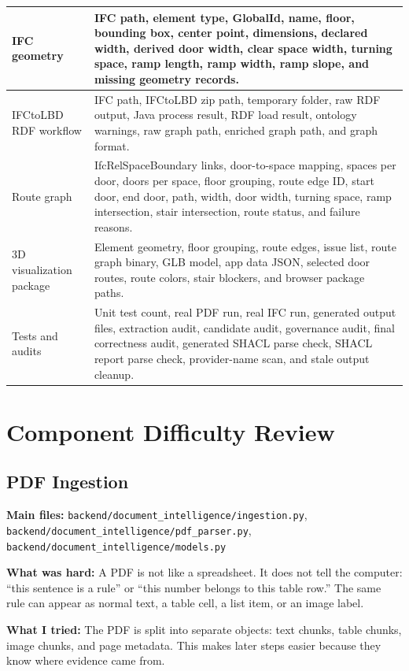 \documentclass[11pt,a4paper]{article}
\begin{document}
\begin{longtable}{|p{3.8cm}|p{11.3cm}|}
\hline
IFC geometry &
IFC path, element type, GlobalId, name, floor, bounding box, center point, dimensions, declared width, derived door width, clear space width, turning space, ramp length, ramp width, ramp slope, and missing geometry records. \\
\hline
IFCtoLBD RDF workflow &
IFC path, IFCtoLBD zip path, temporary folder, raw RDF output, Java process result, RDF load result, ontology warnings, raw graph path, enriched graph path, and graph format. \\
\hline
Route graph &
IfcRelSpaceBoundary links, door-to-space mapping, spaces per door, doors per space, floor grouping, route edge ID, start door, end door, path, width, door width, turning space, ramp intersection, stair intersection, route status, and failure reasons. \\
\hline
3D visualization package &
Element geometry, floor grouping, route edges, issue list, route graph binary, GLB model, app data JSON, selected door routes, route colors, stair blockers, and browser package paths. \\
\hline
Tests and audits &
Unit test count, real PDF run, real IFC run, generated output files, extraction audit, candidate audit, governance audit, final correctness audit, generated SHACL parse check, SHACL report parse check, provider-name scan, and stale output cleanup. \\
\hline
\end{longtable}

\section{Component Difficulty Review}

\subsection{PDF Ingestion}
\textbf{Main files:} \texttt{backend/document\_intelligence/ingestion.py}, \texttt{backend/document\_intelligence/pdf\_parser.py}, \texttt{backend/document\_intelligence/models.py}

\textbf{What was hard:}
A PDF is not like a spreadsheet. It does not tell the computer: ``this sentence is a rule'' or ``this number belongs to this table row.'' The same rule can appear as normal text, a table cell, a list item, or an image label.

\textbf{What I tried:}
The PDF is split into separate objects: text chunks, table chunks, image chunks, and page metadata. This makes later steps easier because they know where evidence came from.
\end{document}
